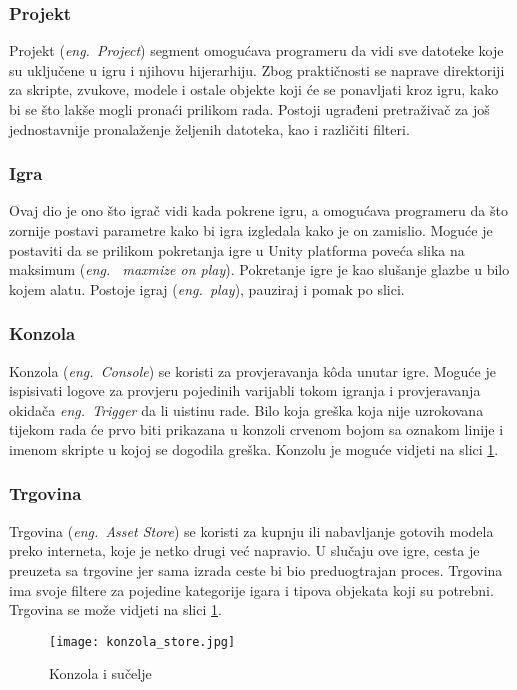 \subsubsection{Projekt}
Projekt (\emph{eng.~Project}) segment omogućava programeru da vidi sve datoteke koje su uključene u igru i njihovu hijerarhiju. Zbog praktičnosti se naprave direktoriji za skripte, zvukove, modele i ostale objekte koji će se ponavljati kroz igru, kako bi se što lakše mogli pronaći prilikom rada. Postoji ugrađeni pretraživač za još jednostavnije pronalaženje željenih datoteka, kao i različiti filteri.

\subsubsection{Igra}
Ovaj dio je ono što igrač vidi kada pokrene igru, a omogućava programeru da što zornije postavi parametre kako bi igra izgledala kako je on zamislio. Moguće je postaviti da se prilikom pokretanja igre u Unity platforma poveća slika na maksimum (\emph{eng.~ maxmize on play}). Pokretanje igre je kao slušanje glazbe u bilo kojem alatu. Postoje igraj (\emph{eng.~play}), pauziraj i pomak po slici.

\subsubsection{Konzola}
Konzola (\emph{eng.~Console}) se koristi za provjeravanja k\^oda unutar igre. Moguće je ispisivati logove za provjeru pojedinih varijabli tokom igranja i provjeravanja okidača \emph{eng.~Trigger}  da li uistinu rade. Bilo koja greška koja nije uzrokovana tijekom rada će prvo biti prikazana u konzoli crvenom bojom sa oznakom linije i imenom skripte u kojoj se dogodila greška. Konzolu je moguće vidjeti na slici \ref{fig:konzolaStore}.

\subsubsection{Trgovina}
Trgovina (\emph{eng.~Asset Store}) se koristi za kupnju ili nabavljanje gotovih modela preko interneta, koje je netko drugi već napravio. U slučaju ove igre, cesta je preuzeta sa trgovine jer sama izrada ceste bi bio preduogtrajan proces. Trgovina ima svoje filtere za pojedine kategorije igara i tipova objekata koji su potrebni. Trgovina se može vidjeti na slici \ref{fig:konzolaStore}.

\begin{figure}[h]
	\texttt{[image: konzola\_store.jpg]}
	\centering
	\caption{Konzola i sučelje}
	\label{fig:konzolaStore}
\end{figure}

